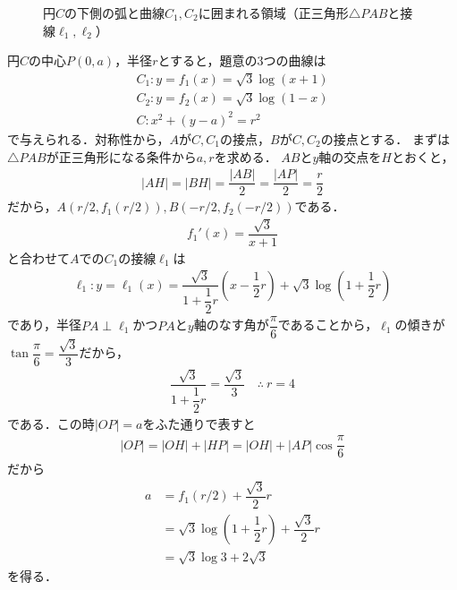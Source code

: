 \documentclass[../../main.tex]{subfiles}
\begin{document}
\begin{figure}[htb]
  \caption{円$C$の下側の弧と曲線$C_1,C_2$に囲まれる領域（正三角形$\triangle PAB$と接線$\ell_1,\ell_2$）}
  \label{fig:curves_c1_c2_c}
\end{figure}

円$C$の中心$P(0,a)$，半径$r$とすると，題意の$3$つの曲線は
\begin{align}
  C_1:y=f_1(x)=\sqrt{3}\log(x+1) \\
  C_2:y=f_2(x)=\sqrt{3}\log(1-x) \\
  C:  x^2 + (y-a)^2 = r^2
\end{align}
で与えられる．対称性から，$A$が$C,C_1$の接点，$B$が$C,C_2$の接点とする．
まずは$\triangle PAB$が正三角形になる条件から$a,r$を求める．
$AB$と$y$軸の交点を$H$とおくと，
\begin{align}
  |AH|=|BH| = \dfrac{|AB|}{2} = \dfrac{|AP|}{2} = \dfrac{r}{2}
\end{align}
だから，$A(r/2,f_1(r/2)),B(-r/2,f_2(-r/2))$である．
\begin{align}
  f_1'(x) = \dfrac{\sqrt{3}}{x+1}
\end{align}
と合わせて$A$での$C_1$の接線$\ell_1$は
\begin{align}
  \ell_1:y=\ell_1(x)=\dfrac{\sqrt{3}}{1+\dfrac{1}{2}r}\left(x-\dfrac{1}{2}r\right)+\sqrt{3}\log\left(1+\dfrac{1}{2}r\right) \label{eq:1}
\end{align}
であり，半径$PA\perp\ell_1$かつ$PA$と$y$軸のなす角が$\dfrac{\pi}{6}$であることから，$\ell_1$の傾きが$\tan\dfrac{\pi}{6}=\dfrac{\sqrt{3}}{3}$だから，
\begin{align}
  \dfrac{\sqrt{3}}{1+\dfrac{1}{2}r}=\dfrac{\sqrt{3}}{3}\quad\therefore\ r=4 \label{eq:2}
\end{align}
である．この時$|OP|=a$をふた通りで表すと
\begin{align}
  |OP| = |OH| + |HP| = |OH| + |AP|\cos\dfrac{\pi}{6}
\end{align}
だから
\begin{align}
  a
  & = f_1(r/2) + \dfrac{\sqrt{3}}{2}r \\
  & = \sqrt{3}\log\left(1+\dfrac{1}{2}r\right)+\dfrac{\sqrt{3}}{2}r \\
  &= \sqrt{3}\log3+2\sqrt{3} \label{eq:3}
\end{align}
を得る．
\end{document}
